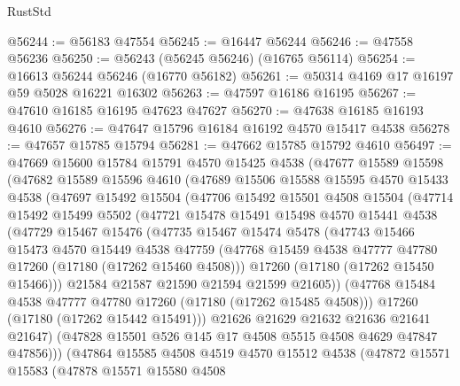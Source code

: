 \begin{lexlean}{RustStd}
\begin{coremodule}
{\begin{coremodule}
{{{{{{{{{{{{{{{{{{{{{{{{{{{{{{{{{{{{{{{{{{{{{{{{{{{{{{{@56244 := @56183 @47554
@56245 := @16447 @56244
@56246 := @47558 @56236
@56250 := @56243 (@56245 @56246) (@16765 @56114)
@56254 := @16613 @56244 @56246 (@16770 @56182)
@56261 := @50314 @4169 @17 @16197 @59 @5028 @16221 @16302
@56263 := @47597 @16186 @16195
@56267 := @47610 @16185 @16195 @47623 @47627
@56270 := @47638 @16185 @16193 @4610
@56276 := @47647 @15796 @16184 @16192 @4570 @15417 @4538
@56278 := @47657 @15785 @15794
@56281 := @47662 @15785 @15792 @4610
@56497 := @47669
    @15600
    @15784
    @15791
    @4570
    @15425
    @4538
    (@47677
      @15589
      @15598
      (@47682
        @15589
        @15596
        @4610
        (@47689
          @15506
          @15588
          @15595
          @4570
          @15433
          @4538
          (@47697
            @15492
            @15504
            (@47706
              @15492
              @15501
              @4508
              @15504
              (@47714
                @15492
                @15499
                @5502
                (@47721
                  @15478
                  @15491
                  @15498
                  @4570
                  @15441
                  @4538
                  (@47729
                    @15467
                    @15476
                    (@47735
                      @15467
                      @15474
                      @5478
                      (@47743
                        @15466
                        @15473
                        @4570
                        @15449
                        @4538
                        @47759
                        (@47768 @15459 @4538 @47777 @47780 @17260 (@17180 (@17262 @15460 @4508)))
                        @17260
                        (@17180 (@17262 @15450 @15466)))
                      @21584
                      @21587
                      @21590
                      @21594
                      @21599
                      @21605))
                  (@47768 @15484 @4538 @47777 @47780 @17260 (@17180 (@17262 @15485 @4508)))
                  @17260
                  (@17180 (@17262 @15442 @15491)))
                @21626
                @21629
                @21632
                @21636
                @21641
                @21647)
              (@47828 @15501 @526 @145 @17 @4508 @5515 @4508 @4629 @47847 @47856)))
          (@47864
            @15585
            @4508
            @4519
            @4570
            @15512
            @4538
            (@47872
              @15571
              @15583
              (@47878
                @15571
                @15580
                @4508
}}}}}}}}}}}}}}}}}}}}}}}}}}}}}}}}}}}}}}}}}}}}}}}}}}}}}}}
\end{coremodule}}
\end{coremodule}
\end{lexlean}
